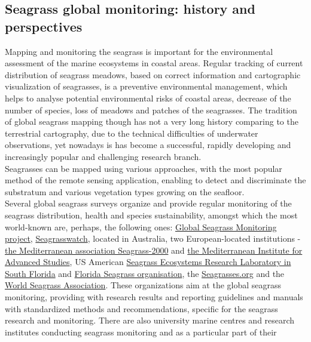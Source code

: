 \documentclass[11pt]{article}
\begin{document}
\subsection{Seagrass global monitoring: history and perspectives}
Mapping and monitoring the seagrass is important for the environmental assessment of the marine
ecosystems in coastal areas. Regular tracking of current distribution of seagrass meadows, based on
correct information and cartographic visualization of seagrasses, is a preventive environmental
management, which helps to analyse potential environmental risks of coastal areas, decrease of the
number of species, loss of meadows and patches of the seagrasses.
The tradition of global seagrass mapping though has not a very long history comparing to the
terrestrial cartography, due to the technical difficulties of underwater observations, yet nowadays is
has become a successful, rapidly developing and increasingly popular and challenging research branch.\\
Seagrasses can be mapped using various approaches, with the most popular method of the remote
sensing application, enabling to detect and discriminate the substratum and various vegetation types
growing on the seafloor.\\
Several global seagrass surveys organize and provide regular monitoring of the seagrass distribution,
health and species sustainability, amongst which the most world-known are, perhaps, the following
ones: \href{http://www.seagrassnet.org/}{Global Seagrass Monitoring project}, \href{http://www.seagrasswatch.org/}{Seagrasswatch}, 
located in Australia, two European-located institutions - \href{http://mediterranean.seagrassonline.org/}{the Mediterranean association Seagrass-2000} and \href{http://www.imedea.uib.es/index.php}{the Mediterranean Institute for Advanced Studies}, US American 
\href{http://www2.fiu.edu/~seagrass/}{Seagrass Ecosystems Research Laboratory in South Florida} and
\href{http://www.flseagrass.org/}{Florida Seagrass organisation}, the \href{http://www.seagrasses.org/}{Seagrasses.org} and the \href{http://wsa.seagrassonline.org/}{World Seagrass Association}.
These organizations aim at the global seagrass monitoring, providing with
research results and reporting guidelines and manuals with standardized methods and
recommendations, specific for the seagrass research and monitoring. There are also university marine
centres and research institutes conducting seagrass monitoring and as a particular part of their
\end{document}
